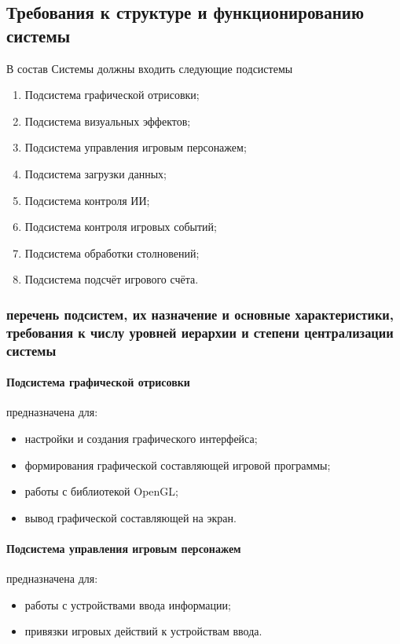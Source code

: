 \subsection{Требования к структуре и функционированию системы}
В состав Системы должны входить следующие подсистемы
\begin{enumerate}
    \item Подсистема графической отрисовки;
    \item Подсистема визуальных эффектов;
    \item Подсистема управления игровым персонажем;
    \item Подсистема загрузки данных;
    \item Подсистема контроля ИИ;
    \item Подсистема контроля игровых событий;
    \item Подсистема обработки столновений;
    \item Подсистема подсчёт игрового счёта.
\end{enumerate}

\subsubsection{перечень подсистем, их назначение и основные характеристики, требования к числу 
    уровней иерархии и степени централизации системы}
\paragraph{Подсистема графической отрисовки}
предназначена для:
\begin{itemize}
    \item настройки и создания графического интерфейса;
    \item формирования графической составляющей игровой программы;
    \item работы с библиотекой OpenGL;
    \item вывод графической составляющей на экран.
\end{itemize}

\paragraph{Подсистема управления игровым персонажем}
предназначена для:
\begin{itemize}
    \item работы с устройствами ввода информации;
    \item привязки игровых действий к устройствам ввода.
\end{itemize}

